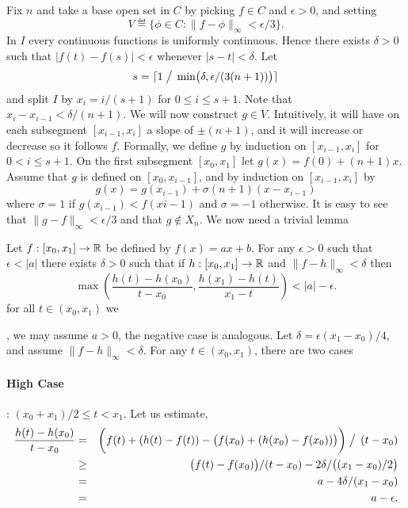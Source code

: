 \begin{enumerate}
Fix $n$ and take a base open set in $C$ by picking \(f\in C\) and 
\(\epsilon>0\), and setting
\[V \eqdef \{\phi\in C: \|f-\phi\|_\infty < \epsilon/3\}.\]
In $I$ every continuous functions is uniformly continuous.
Hence there exists \(\delta>0\) such that \(|f(t)-f(s)|<\epsilon\)
whenever \(|s-t|<\delta\). 
Let 
\[s = \lceil 1\bigm/\,\min\bigl(\delta, \epsilon/(3(n+1))\bigr)\rceil\]
and split $I$ by \(x_i = i/(s+1)\) for \(0\leq i \leq s+1\).
Note that \(x_i - x_{i-1} < \delta/(n+1)\).
We will now construct \(g\in V\).
Intuitively, it will have on each subsegment \([x_{i-1},x_i]\) 
a slope of \(\pm(n+1)\), and it will increase or decrease so it follows $f$.
Formally, we define $g$ by induction on \([x_{i-1},x_i]\) for \(0< i \leq s+1\).
On the first subsegment \([x_0,x_1]\) let
\(g(x) = f(0) + (n+1)x\). Assume that $g$ is defined
on \([x_0,x_{i-1}]\), and by induction on \([x_{i-1}, x_i]\) by
\[g(x) = g(x_{i-1}) + \sigma (n+1)(x - x_{i-1})\]
where \(\sigma=1\) if \(g(x_{i-1}) < f(x{i-1})\) and 
\(\sigma= -1\) otherwise. It is easy to see that \(\|g-f\|_\infty < \epsilon/3\)
and that \(g\notin X_n\).
We now need a trivial lemma
\begin{llem}
Let \(f:[x_0,x_1]\to \mathbb{R}\) be defined by \(f(x) = ax+b\). 
For any \(\epsilon>0\)
such that \(\epsilon<|a|\) there exists \(\delta>0\) such that 
if \(h:[x_0,x_1]\to \mathbb{R}\) and \(\|f-h\|_\infty < \delta\)
then 
\begin{equation} \label{eq:ex5.14:lem}
 \max\left( \frac{h(t) - h(x_0)}{t-x_0}, 
              \frac{h(x_1) - h(t)}{x_1 - t} \right) < |a|-\epsilon. 
\end{equation}
for all \(t\in(x_0,x_1)\) we 
\end{llem}
\begin{thmproof}
\iffalse
By defining  \(\tilde{f}:[0,x_1-x_0]\to \R\)
as \(\tilde{f}(x) = |a|x\)
we see that we can assume that \(f(0)=0\) and \(a>0\).
Since we can similarly convert a $h$ 
and get the same ratios of \eqref{eq:ex5.14:lem}.
\fi
\Wlogy, we may assume \(a>0\), the negative case is analogous.
Let \(\delta = \epsilon(x_1-x_0)/4\), and assume \(\|f-h\|_\infty < \delta\).
For any \(t\in (x_0,x_1)\), there are two cases

\paragraph{High Case}: \((x_0+x_1)/2 \leq t < x_1\).
Let us estimate,
\begin{eqnarray*}
\frac{h(t) - h(x_0)}{t-x_0}
&=& \biggl( f(t) + (h(t)-f(t)) - \bigl(f(x_0) + (h(x_0)-f(x_0))\bigr)\biggr)
    \bigm /\,(t - x_0) \\
&\geq& \bigl(f(t) - f(x_0)\bigr) / (t - x_0) 
        - 2\delta / \bigl((x_1 - x_0)/2\bigr) \\
&=& a - 4\delta/(x_1 - x_0) \\
&=& a - \epsilon.
\end{eqnarray*}


\end{thmproof}
\end{enumerate}
